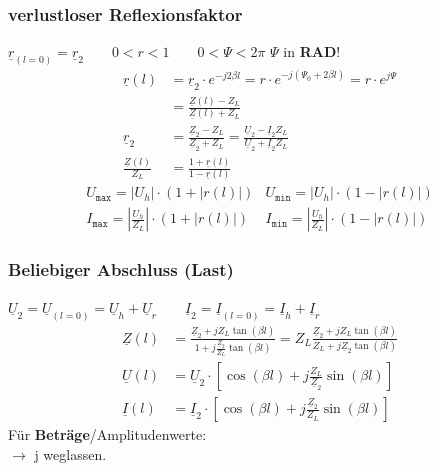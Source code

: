 \subsubsection{verlustloser Reflexionsfaktor}

$ \underline{r}_{(l=0)} = \underline{r}_2 \qquad 0<r<1 \qquad 0<\Psi<2\pi $ $\Psi$ in \textbf{RAD}!
\begin{align*}
	\underline{r}(l)  &= \underline{r}_2 \cdot e^{-j2\beta l} = r \cdot e^{-j(\Psi_0+2\beta l)} =r\cdot e^{j\Psi} \\ &=\tfrac{\underline{Z}(l)-Z_L}{\underline{Z}(l)+Z_L}\\
	\underline{r}_2 & = \tfrac{\underline{Z}_2-Z_L}{\underline{Z}_2+Z_L} = \tfrac{\underline{U}_2-\underline{I}_2Z_L}{\underline{U}_2 +\underline{I}_2 Z_L}\\
	\tfrac{\underline{Z}(l)}{Z_L} & = \tfrac{1+\underline{r}(l)}{1-\underline{r}(l)}
\end{align*}
\begin{align*}
	&U_{\texttt{max}} = |U_h| \cdot (1+|r(l)|) & U_{\texttt{min}} = |U_h| \cdot (1-|r(l)|) &\\
	&I_{\texttt{max}} = \left | \frac{U_h}{Z_L} \right | \cdot (1+|r(l)|) & I_{\texttt{min}} = \left| \frac{U_h}{Z_L} \right | \cdot (1-|r(l)|) &
\end{align*}	
\subsubsection{Beliebiger Abschluss (Last)} \label{beliebig_abschluss}
$\underline{U}_2 = \underline{U}_{(l=0)} =  \underline{U}_h  +\underline{U}_r \qquad \underline{I}_2 = \underline{I}_{(l=0)} =  \underline{I}_h  +\underline{I}_r $	
\begin{align*}
	\underline{Z}(l) & = 
	\frac{\underline{Z}_2+jZ_L\tan(\beta 
	l)}{1+ j \frac{\underline{Z}_2}{Z_L}\tan(\beta l)}
	= Z_L \frac{\underline{Z}_2 + j Z_L \tan(\beta l)}{Z_L + j \underline{Z}_2 \tan(\beta l)}\\
	\underline{U}(l) & = \underline{U}_2 \cdot \left[ \cos(\beta l) + j \tfrac{Z_L}{\underline{Z}_2} \sin(\beta l) \right] \\
	\underline{I}(l) & = \underline{I}_2 \cdot \left[ \cos(\beta l) + j \tfrac{\underline{Z}_2}{Z_L} \sin(\beta l) \right] 
\end{align*}
Für \textbf{Beträge}/Amplitudenwerte: \quad 
{}
\\$ \rightarrow $ j weglassen.\\

